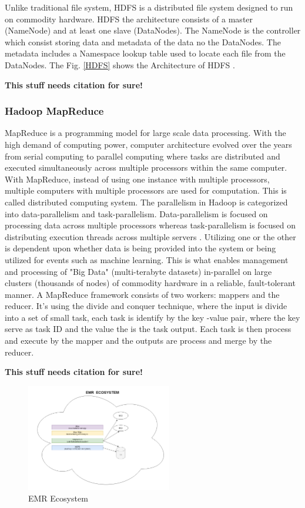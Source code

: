 \documentclass[journal]{IEEEtran}
\begin{document}
Unlike traditional file system, HDFS is a distributed file system designed to run on commodity hardware. 
HDFS the architecture consists of a master (NameNode) and at least one slave (DataNodes).
The NameNode is the controller which consist storing data and metadata of the data no the DataNodes. The metadata includes a Namespace lookup table used to locate each file from the DataNodes. 
The Fig. \ref{HDFS} shows the Architecture of HDFS \cite{HDFS_digram}.

\textbf{This stuff needs citation for sure!}

\subsubsection{Hadoop MapReduce}

MapReduce is a programming model for large scale data processing. 
With the high demand of computing power, computer architecture evolved over the years from serial computing to parallel computing where tasks are distributed and executed simultaneously across multiple processors within the same computer. 
With MapReduce, instead of using one instance with multiple processors, multiple computers with multiple processors are used for computation.
This is called distributed computing system. 
The parallelism in Hadoop is categorized into data-parallelism and task-parallelism.
Data-parallelism is focused on processing data across multiple processors whereas task-parallelism is focused on distributing execution threads across multiple servers \cite{Parallelism}. 
Utilizing one or the other is dependent upon whether data is being provided into the system or being utilized for events such as machine learning. 
This is what enables management and processing of "Big Data" (multi-terabyte datasets) in-parallel on large clusters (thousands of nodes) of commodity hardware in a reliable, fault-tolerant manner. 
A MapReduce framework consists of two workers: mappers and the reducer.
It's using the divide and conquer technique, where the input is divide into a set of small task, each task is identify by the key -value pair, where the key serve as task ID and the value the is the task output. 
Each task is then process and execute by the mapper and the outputs are process and merge by the reducer.

\textbf{This stuff needs citation for sure!}

\begin{figure}
	\centering
	\includegraphics[width=2.5in]{EMR_Ecosystem.png}
	\caption{EMR Ecosystem}
	\label{EMR}
\end{figure}
\end{document}
